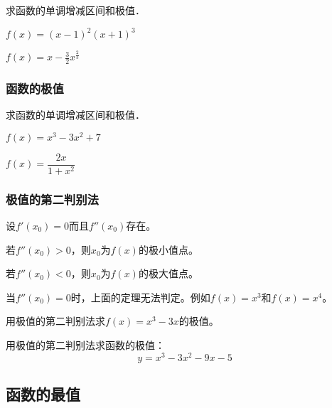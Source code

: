 \documentclass[14pt,notheorems,leqno,xcolor={rgb}]{beamer} %
\begin{document}
\begin{frame}
\begin{example}
求函数的单调增减区间和极值．
\begin{enumlite}
  \item $f(x)=(x-1)^2(x+1)^3$\pause
  \item $f(x)=x-\frac32x^{\frac23}$
\end{enumlite}
\end{example}
\end{frame}

\begin{oframe}
\frametitle{函数的极值}
\begin{exercise}
求函数的单调增减区间和极值．
\begin{enumlite}
  \item $f(x)=x^3-3x^2+7$\pause
  \item $f(x)=\dfrac{2x}{1+x^2}$
\end{enumlite}
\end{exercise}
\end{oframe}

\begin{frame}
\frametitle{极值的第二判别法}
\begin{theorem}
设$f'(x_0)=0$而且$f''(x_0)$存在。
\begin{enumskip}
  \item 若$f''(x_0)>0$，则$x_0$为$f(x)$的极小值点。
  \item 若$f''(x_0)<0$，则$x_0$为$f(x)$的极大值点。
\end{enumskip}
\end{theorem}\pause
\begin{remark}
当$f''(x_0)=0$时，上面的定理无法判定。例如$f(x)=x^3$和$f(x)=x^4$。
\end{remark}
\end{frame}

\begin{frame}
\begin{example}
用极值的第二判别法求$f(x)=x^3-3x$的极值。
\end{example}\pause
\begin{exercise}
用极值的第二判别法求函数的极值：
$$y=x^3-3x^2-9x-5$$
\end{exercise}
\end{frame}

\subsection{函数的最值}
\end{document}
